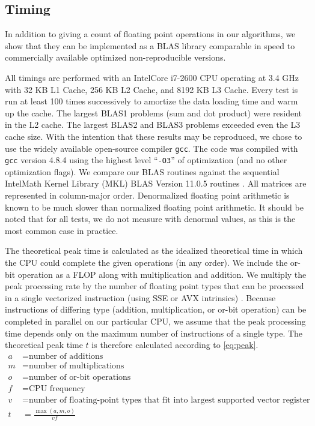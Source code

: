 \subsection{Timing}
  In addition to giving a count of floating point operations in our algorithms, we show that they can be implemented as a BLAS library comparable in speed to commercially available optimized non-reproducible versions.

  All timings are performed with an Intel\textregistered Core i7-2600 CPU
  operating at 3.4 GHz with 32 KB L1 Cache, 256 KB L2 Cache, and 8192 KB L3
  Cache. Every test is run at least 100 times successively to amortize the data
  loading time and warm up the cache. The largest BLAS1 problems (sum and dot
  product) were resident in the L2 cache. The largest BLAS2 and BLAS3 problems
  exceeded even the L3 cache size. With the intention that these results may be
  reproduced, we chose to use the widely available open-source compiler
  \texttt{gcc}. The code was compiled with \texttt{gcc} version 4.8.4 using the
  highest level ``\texttt{-O3}'' of optimization (and no other optimization
  flags). We compare our BLAS routines against the sequential
  Intel\textregistered Math Kernel Library (MKL) BLAS Version 11.0.5 routines
  \cite{MKL}. All matrices are represented in column-major order. Denormalized
  floating point arithmetic is known to be much slower than normalized floating
  point arithmetic. It should be noted that for all tests, we do not measure with
  denormal values, as this is the most common case in practice.

  The theoretical peak time is calculated as the idealized theoretical time in
  which the CPU could complete the given operations (in any order). We include the or-bit operation as a FLOP along with multiplication and addition. We
  multiply the peak processing rate by the number of floating point types that
  can be processed in a single vectorized instruction (using SSE or AVX
  intrinsics) \cite{SSEAVX}. Because instructions of differing type (addition,
  multiplication, or or-bit operation) can be completed in parallel on our
  particular CPU, we assume that the peak processing time depends only on the
  maximum number of instructions of a single type. The theoretical peak
  time $t$ is therefore calculated according to \eqref{eq:peak}.
  \begin{align}
    a &= \text{number of additions}\nonumber\\
    m &= \text{number of multiplications}\nonumber\\
    o &= \text{number of or-bit operations}\nonumber\\
    f &= \text{CPU frequency}\nonumber\\
    v &= \text{number of floating-point types that fit into largest supported vector register}\nonumber\\
    t &= \frac{\max(a, m, o)}{vf}
    \label{eq:peak}
  \end{align}


